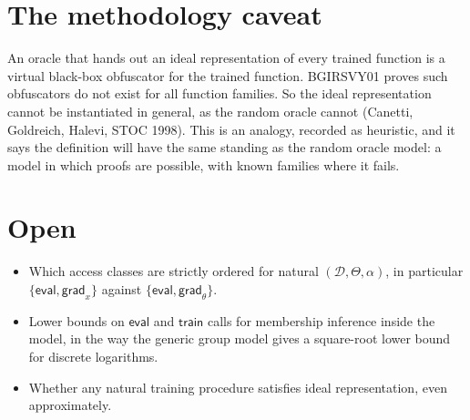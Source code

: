 \documentclass[
]{article}
\providecommand{\tightlist}{%
  \setlength{\itemsep}{0pt}\setlength{\parskip}{0pt}}
\begin{document}
\section{The methodology caveat}\label{the-methodology-caveat}

An oracle that hands out an ideal representation of every trained
function is a virtual black-box obfuscator for the trained function.
BGIRSVY01 proves such obfuscators do not exist for all function
families. So the ideal representation cannot be instantiated in general,
as the random oracle cannot (Canetti, Goldreich, Halevi, STOC 1998).
This is an analogy, recorded as heuristic, and it says the definition
will have the same standing as the random oracle model: a model in which
proofs are possible, with known families where it fails.

\section{Open}\label{open}

\begin{itemize}
\tightlist
\item
  Which access classes are strictly ordered for natural
  \((\mathcal{D}, \Theta, \alpha)\), in particular
  \(\{\mathsf{eval}, \mathsf{grad}_x\}\) against
  \(\{\mathsf{eval}, \mathsf{grad}_\theta\}\).
\item
  Lower bounds on \(\mathsf{eval}\) and \(\mathsf{train}\) calls for
  membership inference inside the model, in the way the generic group
  model gives a square-root lower bound for discrete logarithms.
\item
  Whether any natural training procedure satisfies ideal representation,
  even approximately.
\end{itemize}
\end{document}
